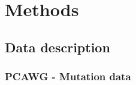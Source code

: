 \chapter{Methods}\label{methods}




\section{Data description}
\subsection{PCAWG - Mutation data} 



